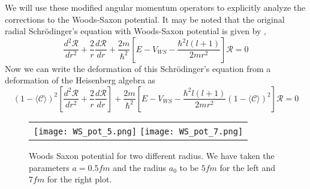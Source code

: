 \documentclass[12pt]{article}
\begin{document}
We will use these modified angular momentum operators  to explicitly analyze the corrections to the Woods-Saxon potential. It may be noted that the original radial Schr\"{o}dinger's equation   with Woods-Saxon potential is given by  \cite{wood, wood1, wood2, wood4, wood5},
\begin{equation} \label{SE}
	\frac{d^2 \mathcal{R}}{dr^2} + \frac{2}{r} \frac{d\mathcal{R}}{dr} + \frac{2m}{\hbar^2} \left[E - V_{WS} -\frac{\hbar^2 l(l+1)}{2mr^2} \right] \mathcal{R} = 0
\end{equation}
Now we can write the deformation of this Schr\"{o}dinger's equation   from a deformation of the Heisenberg algebra as \cite{an12, an14} 
\begin{equation} \label{GUP_SE1}
	\left(1 - \langle\mathcal{C}\rangle\right)^2 \left[\frac{d^2 \mathcal{R}}{dr^2} + \frac{2}{r} \frac{d\mathcal{R}}{dr}\right] + \frac{2m}{\hbar^2} \left[E - V_{WS} -\frac{\hbar^2 l(l+1)}{2mr^2} \left(1 - \langle\mathcal{C}\rangle\right)^2 \right] \mathcal{R} =0
\end{equation} 


\begin{figure}
\begin{tabular}{c}
\texttt{[image: WS\_pot\_5.png]} \hspace*{.2cm}\texttt{[image: WS\_pot\_7.png]}
\end{tabular}
	
	\caption{Woods Saxon potential for two  different radius. We have taken the parameters $a = 0.5 fm$ and the radius $a_0$ to be $5fm$ for the left and $7fm$ for the right plot. }\label{WS_plot}
\end{figure}
\end{document}
